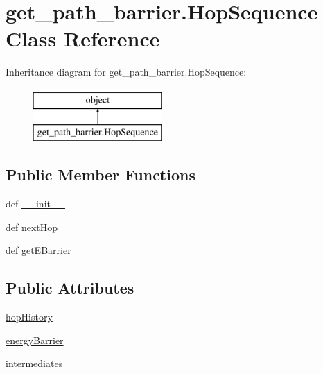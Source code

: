 \hypertarget{classget__path__barrier_1_1_hop_sequence}{\section{get\-\_\-path\-\_\-barrier.\-Hop\-Sequence Class Reference}
\label{classget__path__barrier_1_1_hop_sequence}
}
Inheritance diagram for get\-\_\-path\-\_\-barrier.\-Hop\-Sequence\-:\begin{figure}[H]
\begin{center}
\leavevmode
\includegraphics[height=2.000000cm]{classget__path__barrier_1_1_hop_sequence}
\end{center}
\end{figure}
\subsection*{Public Member Functions}
\begin{DoxyCompactItemize}
\item 
def \hyperlink{classget__path__barrier_1_1_hop_sequence_a3e4932d6b92f4c4cdd2c75af9139471d}{\-\_\-\-\_\-init\-\_\-\-\_\-}
\item 
def \hyperlink{classget__path__barrier_1_1_hop_sequence_ad1899d97aecd2215fd82075ce23f606a}{next\-Hop}
\item 
def \hyperlink{classget__path__barrier_1_1_hop_sequence_a50093adf1d30dca2b491fb549e3e5225}{get\-E\-Barrier}
\end{DoxyCompactItemize}
\subsection*{Public Attributes}
\begin{DoxyCompactItemize}
\item 
\hyperlink{classget__path__barrier_1_1_hop_sequence_a579cbd71947f980116542947f6fc3bb3}{hop\-History}
\item 
\hyperlink{classget__path__barrier_1_1_hop_sequence_a0bcfd627eb7a3a1adbcea611d1e4b6a6}{energy\-Barrier}
\item 
\hyperlink{classget__path__barrier_1_1_hop_sequence_aa539256b485b15e0bfb1388e832c4060}{intermediates}
\end{DoxyCompactItemize}
